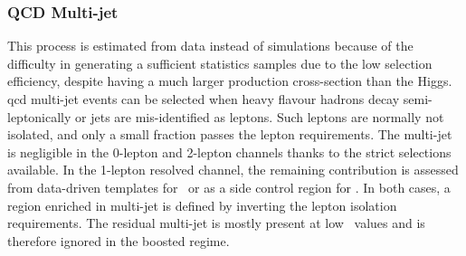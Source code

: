 \subsubsection{QCD Multi-jet}
This process is estimated from data instead of simulations because of the difficulty in generating a sufficient statistics samples due to the low selection efficiency, despite having a much larger production cross-section than the Higgs. \gls{qcd} multi-jet events can be selected when heavy flavour hadrons decay semi-leptonically or jets are mis-identified as leptons. Such leptons are normally not isolated, and only a small fraction passes the lepton requirements. The multi-jet is negligible in the 0-lepton and 2-lepton channels thanks to the strict selections available. In the 1-lepton resolved channel, the remaining contribution is assessed from data-driven templates for \vhb\ or as a side control region for \vhc. In both cases, a region enriched in multi-jet is defined by inverting the lepton isolation requirements. The residual multi-jet is mostly present at low \ptv\ values and is therefore ignored in the boosted regime. \\



